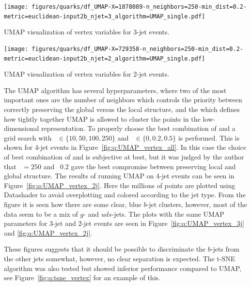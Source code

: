 \begin{marginfigure}
  \centerfloat
  \texttt{[image: figures/quarks/df\_UMAP-X=1078089-n\_neighbors=250-min\_dist=0.2-metric=euclidean-input2b\_njet=3\_algorithm=UMAP\_single.pdf]}
  \caption[UMAP visualization of vertex variables for 3-jet events]
          {UMAP visualization of vertex variables for 3-jet events.} 
  \label{fig:q:UMAP_vertex_3j}
\end{marginfigure}

\begin{marginfigure}
  \centerfloat
  \texttt{[image: figures/quarks/df\_UMAP-X=729358-n\_neighbors=250-min\_dist=0.2-metric=euclidean-input2b\_njet=2\_algorithm=UMAP\_single.pdf]}
  \caption[UMAP visualization of vertex variables for 2-jet events]
          {UMAP visualization of vertex variables for 2-jet events.} 
  \label{fig:q:UMAP_vertex_2j}
\end{marginfigure}

The UMAP algorithm has several hyperparameters, where two of the most important ones are the number of neighbors  which controls the priority between correctly preserving the global versus the local structure, and the  which defines how tightly together UMAP is allowed to cluster the points in the low-dimensional representation. To properly choose the best combination of  and  a grid search with ~$\in \{10, 50, 100, 250 \}$ and ~$\in \{0, 0.2, 0.5\}$ is performed. This is shown for 4-jet events in Figure~\ref{fig:q:UMAP_vertex_all}. In this case the choice of best combination of  and  is subjective at best, but it was judged by the author that ~$=250$ and ~$0.2$ gave the best compromise between preserving local and global structure. The results of running UMAP on 4-jet events can be seen in Figure~\ref{fig:q:UMAP_vertex_2j}. Here the millions of points are plotted using Datashader \autocite{bednarDatashaderRevealingStructure2019} to avoid overplotting and colored according to the jet type. From the figure it is seen how there are some clear, blue $b$-jet clusters, however, most of the data seem to be a mix of $g$- and $uds$-jets. The plots with the same UMAP parameters for 3-jet and 2-jet events are seen in Figure~\ref{fig:q:UMAP_vertex_3j} and \ref{fig:q:UMAP_vertex_2j}. 

These figures suggests that it should be possible to discriminate the $b$-jets from the other jets somewhat, however, no clear separation is expected. The t-SNE algorithm was also tested but showed inferior performance compared to UMAP, see Figure~\ref{fig:q:tsne_vertex} for an example of this.



